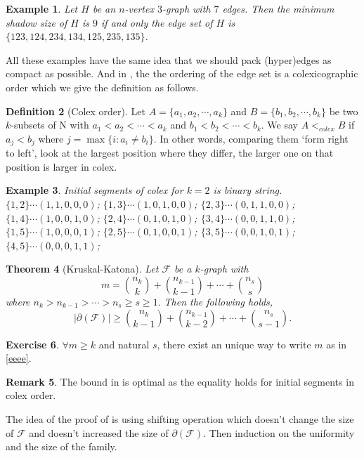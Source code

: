 \documentclass{article}
\newtheorem{theorem}{Theorem}[section]
\newtheorem{example}[theorem]{Example}
\theoremstyle{definition}
\newtheorem{remark}[theorem]{Remark}
\newtheorem{definition}[theorem]{Definition}
\newtheorem{exercise}[theorem]{Exercise}
\begin{document}
\begin{example} \label{18-e}
    Let $H$ be an $n$-vertex $3$-graph with $7$ edges. Then the minimum shadow size of $H$ is $9$ if and only the edge set of $H$ is $\{123,124,234,134,125,235,135\}$.
\end{example}
All these examples have the same idea that we should pack (hyper)edges as compact as possible. And in , the the ordering of the edge set is a colexicographic order which we give the definition as follows. 
\begin{definition}[Colex order]
Let $A=\{a_1,a_2,\cdots,a_k\}$ and $B=\{b_1,b_2,\cdots,b_k\}$ be two $k$-subsets of $\mathrm{N}$ with $a_1<a_2<\cdots<a_k$ and $b_1<b_2<\cdots<b_k$. We say $A<_{colex}B$ if $a_j<b_j$ where $j=\max \{i:a_i\neq b_i\}$. In other words, comparing them `form right to left', look at the largest position where they differ, the larger one on that position is larger in colex.
\end{definition}
\begin{example}
    Initial segments of colex for $k=2$ is binary string.\\
   $\{1,2\}\cdots (1,1,0,0,0)$;
  $\{1,3\}\cdots (1,0,1,0,0)$;
    $\{2,3\}\cdots (0,1,1,0,0)$;\\
     $\{1,4\}\cdots (1,0,0,1,0)$;
     $\{2,4\}\cdots (0,1,0,1,0)$;
     $\{3,4\}\cdots (0,0,1,1,0)$;\\
     $\{1,5\}\cdots (1,0,0,0,1)$;
     $\{2,5\}\cdots (0,1,0,0,1)$;
     $\{3,5\}\cdots (0,0,1,0,1)$;\\
     $\{4,5\}\cdots (0,0,0,1,1)$;
\end{example}

\begin{theorem}[Kruskal-Katona] \label{KK}
    Let $\mathcal{F}$ be a $k$-graph with 
    \begin{equation}\label{eeee}
        m=\binom{n_k}{k}+\binom{n_{k-1}}{k-1}+\cdots+\binom{n_s}{s} 
    \end{equation}
    where $n_k>n_{k-1}>\cdots>n_s\geq s \geq 1.$
    Then the following holds,
    $$|\partial(\mathcal{F})|\geq \binom{n_k}{k-1}+\binom{n_{k-1}}{k-2}+\cdots+\binom{n_s}{s-1}.$$
\end{theorem}
\begin{exercise}
    $\forall m\geq k $ and natural $s$, there exist an unique way to write $m$ as in \cref{eeee}.
    \begin{remark}
        The bound in  is optimal as the equality holds for initial segments in colex order.
    \end{remark}
\end{exercise}
The idea of the proof of  is using shifting operation which doesn't change the size of $\mathcal{F}$ and doesn't increased the size of $\partial(\mathcal{F})$. Then induction on the uniformity and the size of the family.
\end{document}
